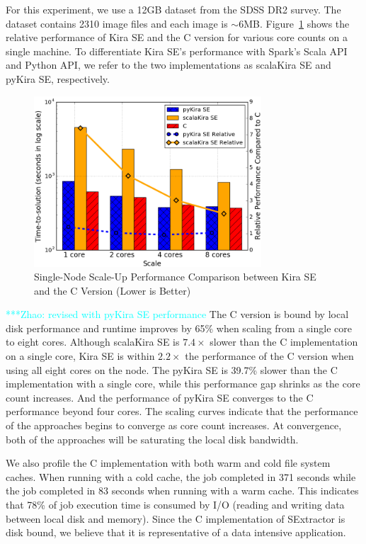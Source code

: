 \documentclass[10pt,journal,compsoc]{IEEEtran}
\newcommand{\zhaonote}[1]{{\textcolor{cyan}    { ***Zhao:      #1 }}}
\newcommand{\zhaonote}[1]{}
\begin{document}
For this experiment, we use a 12GB dataset from the SDSS DR2 survey. The dataset contains
2310 image files and each image is $\sim$6MB.
Figure~\ref{fig:scaleup} shows the relative
performance of Kira SE and the C version for various core counts on a single machine.
To differentiate Kira SE's performance with Spark's Scala API and Python API, we refer
to the two implementations as scalaKira SE and pyKira SE, respectively.

\begin{figure}[h]
	\begin{center}
		\includegraphics[width=85mm]{pictures/scaleup}
		\caption{Single-Node Scale-Up Performance Comparison between Kira SE and the C Version (Lower is Better)
		\label{fig:scaleup}}
  	\end{center}
\end{figure}

\zhaonote{revised with pyKira SE performance}
The C version is bound by local disk performance and runtime improves by 65\% when scaling from a single core
to eight cores.
Although scalaKira SE is $7.4\times$ slower than the C implementation
on a single core, Kira SE is within $2.2\times$ the performance of the C version when using all eight cores on the node.
The pyKira SE is 39.7\% slower than the C implementation with a single core, while this performance gap
shrinks as the core count increases. And the performance of pyKira SE converges to the C performance beyond four cores.
The scaling curves indicate that the performance of the approaches begins to converge
as core count increases. At convergence, both of the approaches will be saturating the local
disk bandwidth.

We also profile the C implementation with both warm and cold file system caches. When running with a
cold cache, the job completed in 371 seconds while the job completed in 83 seconds when
running with a warm cache. This indicates that 78\% of job execution time is consumed by
I/O (reading and writing data between local disk and memory). Since the C implementation of
SExtractor is disk bound, we believe that it is representative of a data intensive application. 
\end{document}
